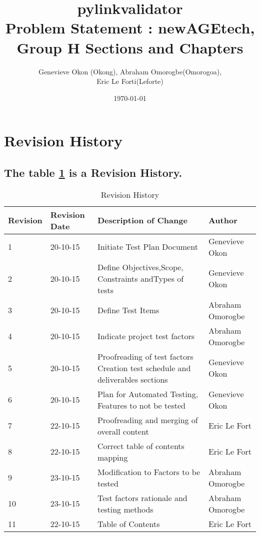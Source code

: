 \documentclass[12pt]{article}
\begin{document}
\title{pylinkvalidator \\
 Problem Statement : newAGEtech, Group H }
 \title{Sections and Chapters}
\author{Genevieve Okon (Okong), Abraham Omorogbe(Omorogoa),\\
 Eric Le Forti(Leforte)}
\date{\today}
\renewcommand*\contentsname{Table of Contents}

\maketitle


\section{Revision History}


\begin{table}[h!]
\subsection{The table \ref {table:Revision History} is a Revision History.}
    \begin{tabular}{| p{5cm} | p{5cm} | p{5cm} |p{5cm} |}    \hline
Revision  &Revision Date &Description of Change &Author\\ \hline
1& 20-10-15& Initiate Test Plan Document&Genevieve Okon\\ \hline
2& 20-10-15& Define Objectives,Scope, Constraints andTypes of tests&Genevieve Okon\\ \hline
3& 20-10-15& Define Test Items&Abraham Omorogbe\\ \hline
4& 20-10-15& Indicate project test factors&Abraham Omorogbe\\ \hline
5& 20-10-15&Proofreading of test factors Creation test schedule and deliverables sections&Genevieve Okon\\ \hline
  6& 20-10-15&Plan for Automated Testing, Features to not be tested&Genevieve Okon\\ \hline



 7& 22-10-15& Proofreading and merging of overall content&Eric Le Fort\\ \hline
  
    8& 22-10-15& Correct table of contents mapping&Eric Le Fort\\ \hline

    
9& 23-10-15& Modification to Factors
to be tested&Abraham Omorogbe\\ \hline

10& 23-10-15& Test factors rationale and testing methods&Abraham Omorogbe\\ \hline
11& 22-10-15& Table of Contents&Eric Le Fort\\ \hline

       \end{tabular}
       
    \caption{Revision History}
\label{table:Revision History}

\end{table}
\end{document}
